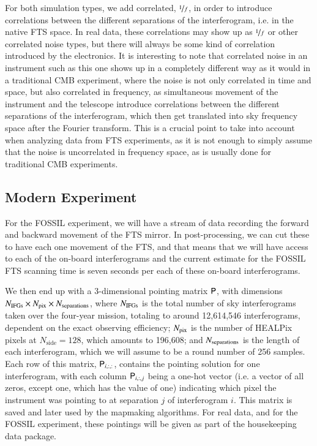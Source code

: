 \documentclass{aa}
\newcommand{\matP}[0]{\tens{P}}
\begin{document}
For both simulation types, we add correlated, $\nicefrac{1}{f}$, in order to introduce correlations between the different separations of the interferogram, i.e. in the native FTS space. In real data, these correlations may show up as $\nicefrac{1}{f}$ or other correlated noise types, but there will always be some kind of correlation introduced by the electronics. It is interesting to note that correlated noise in an instrument such as this one shows up in a completely different way as it would in a traditional CMB experiment, where the noise is not only correlated in time and space, but also correlated in frequency, as simultaneous movement of the instrument and the telescope introduce correlations between the different separations of the interferogram, which then get translated into sky frequency space after the Fourier transform. This is a crucial point to take into account when analyzing data from FTS experiments, as it is not enough to simply assume that the noise is uncorrelated in frequency space, as is usually done for traditional CMB experiments.

\subsection{Modern Experiment}
\label{sec:modern}

For the FOSSIL experiment, we will have a stream of data recording the forward and backward movement of the FTS mirror. In post-processing, we can cut these to have each one movement of the FTS, and that means that we will have access to each of the on-board interferograms and the current estimate for the FOSSIL FTS scanning time is seven seconds per each of these on-board interferograms.


We then end up with a 3-dimensional pointing matrix $\matP$, with dimensions $N_{\rm IFGs} \times N_{\rm pix} \times N_{\rm separations}$, where $N_{\rm IFGs}$ is the total number of sky interferograms taken over the four-year mission, totaling to around 12,614,546 interferograms, dependent on the exact observing efficiency; $N_{\rm pix}$ is the number of HEALPix pixels at $N_\mathrm{side}=128$, which amounts to 196,608; and $N_{\rm separations}$ is the length of each interferogram, which we will assume to be a round number of 256 samples. Each row of this matrix, $\matP_{i,:,:}$, contains the pointing solution for one interferogram, with each column $\matP_{i,:,j}$ being a one-hot vector (i.e. a vector of all zeros, except one, which has the value of one) indicating which pixel the instrument was pointing to at separation $j$ of interferogram $i$. This matrix is saved and later used by the mapmaking algorithms. For real data, and for the FOSSIL experiment, these pointings will be given as part of the housekeeping data package.
\end{document}
